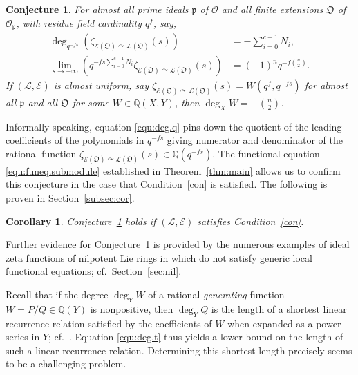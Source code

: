 \documentclass[11pt]{amsart}
\numberwithin{equation}{section}
\numberwithin{figure}{section}
\theoremstyle{plain}
\newtheorem{corollary}[theorem]{Corollary}
\newtheorem{conjecture}[theorem]{Conjecture}
\theoremstyle{definition}
\theoremstyle{remark}
\begin{document}
\begin{conjecture}\label{con:deg}
  For almost all prime ideals ${\mathfrak{p}}$ of ${\ensuremath{\mathcal{O}}}$ and all finite
  extensions ${\mathfrak O}$ of ${\ensuremath{\mathcal{O}}}_{\mathfrak{p}}$, with residue field cardinality
  $q^f$, say,
\begin{align}
  \deg_{q^{-fs}}\left( \zeta_{{\mathcal{E}}({\mathfrak O}){\curvearrowright} {\ensuremath{\mathcal{L}}}({\mathfrak O})}(s) \right) & = - \sum_{i=0}^{c-1}N_i,\label{equ:deg.t}\\
  \lim_{s{\rightarrow} - \infty} \left(
    q^{-fs\sum_{i=0}^{c-1}N_i}\zeta_{{\mathcal{E}}({\mathfrak O}){\curvearrowright} {\ensuremath{\mathcal{L}}}({\mathfrak O})}(s)
  \right) &= (-1)^nq^{-f\binom{n}{2}}.\label{equ:deg.q}
\end{align}
If $({\ensuremath{\mathcal{L}}},{\mathcal{E}})$ is almost uniform, say $\zeta_{{\mathcal{E}}({\mathfrak O}){\curvearrowright}
  {\ensuremath{\mathcal{L}}}({\mathfrak O})}(s) = W(q^f,q^{-fs})$ for almost all ${\mathfrak{p}}$ and all
${\mathfrak O}$ for some $W\in{\ensuremath{\mathbb{Q}}}(X,Y)$, then $\deg_X W = -\binom{n}{2}$.
\end{conjecture}

Informally speaking, equation \eqref{equ:deg.q} pins down the quotient
of the leading coefficients of the polynomials in $q^{-fs}$ giving
numerator and denominator of the rational function
$\zeta_{{\mathcal{E}}({\mathfrak O}){\curvearrowright} {\ensuremath{\mathcal{L}}}({\mathfrak O})}(s)\in{\ensuremath{\mathbb{Q}}}(q^{-fs})$. The functional
equation \eqref{equ:funeq.submodule} established in
Theorem~\ref{thm:main} allows us to confirm this conjecture in the
case that Condition~\ref{con} is satisfied. The following is proven in
Section~\ref{subsec:cor}.

\begin{corollary}\label{cor}
  Conjecture~\ref{con:deg} holds if $({\ensuremath{\mathcal{L}}},{\mathcal{E}})$ satisfies
  Condition~\ref{con}.
\end{corollary}

Further evidence for Conjecture~\ref{con:deg} is provided by the
numerous examples of ideal zeta functions of nilpotent Lie rings in
\cite{duSWoodward/08} which do not satisfy generic local functional
equations; cf.\ Section~\ref{sec:nil}.

Recall that if the degree $\deg_YW$ of a rational \emph{generating}
function $W= P/Q \in{\ensuremath{\mathbb{Q}}}(Y)$ is nonpositive, then $\deg_Y Q$ is the
length of a shortest linear recurrence relation satisfied by the
coefficients of $W$ when expanded as a power series in $Y$;
cf.\ \cite[Theorem~4.1.1]{Stanley/97}. Equation \eqref{equ:deg.t} thus
yields a lower bound on the length of such a linear recurrence
relation. Determining this shortest length precisely seems to be a
challenging problem.
\end{document}
